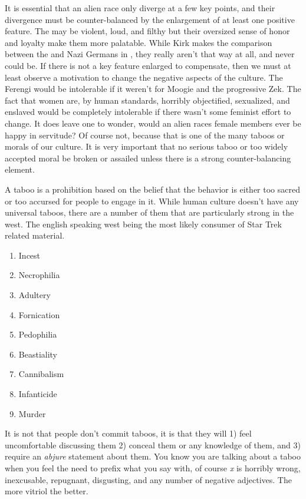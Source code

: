 It is essential that an alien race only diverge at a few key points, and their divergence must be counter-balanced by the enlargement of at least one positive feature. The \klingons may be violent, loud, and filthy but their oversized sense of honor and loyalty make them more palatable. While Kirk makes the comparison between the \klingons and Nazi Germans in , they really aren't that way at all, and never could be. If there is not a key feature enlarged to compensate, then we must at least observe a motivation to change the negative aspects of the culture. The Ferengi would be intolerable if it weren't for Moogie and the progressive Zek. The fact that women are, by human standards, horribly objectified, sexualized, and enslaved would be completely intolerable if there wasn't some feminist effort to change. It does leave one to wonder, would an alien races female members ever be happy in servitude? Of course not, because that is one of the many taboos or morals of our culture. It is very important that no serious taboo or too widely accepted moral be broken or assailed unless there is a strong counter-balancing element. 

A taboo is a prohibition based on the belief that the behavior is either too sacred or too accursed for people to engage in it. While human culture doesn't have any universal taboos, there are a number of them that are particularly strong in the west. The english speaking west being the most likely consumer of Star Trek related material.

\begin{enumerate}
	\item Incest
	\item Necrophilia
	\item Adultery
	\item Fornication
	\item Pedophilia
	\item Beastiality
	\item Cannibalism
	\item Infanticide
	\item Murder
\end{enumerate}

It is not that people don't commit taboos, it is that they will 1) feel uncomfortable discussing them 2) conceal them or any knowledge of them, and 3) require an \textit{abjure} statement about them. You know you are talking about a taboo when you feel the need to prefix what you say with, of course \textit{x} is horribly wrong, inexcusable, repugnant, disgusting, and any number of negative adjectives. The more vitriol the better.

